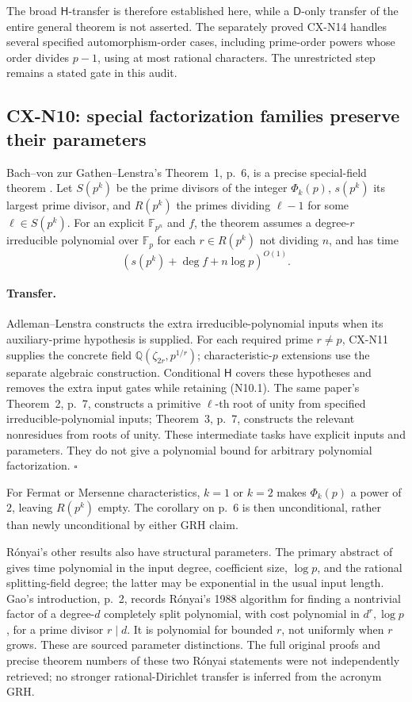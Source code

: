 \documentclass[11pt,a4paper]{article}
\begin{document}
The broad \(\mathsf H\)-transfer is therefore established here, while
a \(\mathsf D\)-only transfer of the entire general theorem is not
asserted. The separately proved CX-N14 handles several specified
automorphism-order cases, including prime-order powers whose order divides
\(p-1\), using at most rational characters. The unrestricted step
remains a stated gate in this audit.

\subsection{CX-N10: special factorization families preserve their parameters}
\label{cx-n10}

Bach--von zur Gathen--Lenstra's Theorem~1, p.~6, is a precise
special-field theorem \cite{CXNBGL01}. Let \(S(p^k)\) be the prime
divisors of the integer \(\Phi_k(p)\), \(s(p^k)\) its largest prime
divisor, and \(R(p^k)\) the primes dividing \(\ell-1\) for some
\(\ell\in S(p^k)\). For an explicit \(\mathbb F_{p^n}\) and \(f\),
the theorem assumes a degree-\(r\) irreducible polynomial over
\(\mathbb F_p\) for each \(r\in R(p^k)\) not dividing \(n\), and has time
\[
                     (s(p^k)+\deg f+n\log p)^{O(1)}.            \tag{N10.1}
\]

\paragraph{Transfer.}
Adleman--Lenstra constructs the extra irreducible-polynomial inputs
when its auxiliary-prime hypothesis is supplied.
For each required prime \(r\ne p\), CX-N11 supplies the concrete
field \(\mathbb Q(\zeta_{2r},p^{1/r})\); characteristic-\(p\)
extensions use the separate algebraic construction.
Conditional \(\mathsf H\) covers these hypotheses and removes the
extra input gates while retaining (N10.1).
The same paper's Theorem~2, p.~7, constructs a primitive
\(\ell\)-th root of unity from specified irreducible-polynomial inputs;
Theorem~3, p.~7, constructs the relevant nonresidues from roots of
unity. These intermediate tasks have explicit inputs and parameters.
They do not give a polynomial bound for arbitrary polynomial
factorization. \(\square\)

For Fermat or Mersenne characteristics, \(k=1\) or \(k=2\) makes
\(\Phi_k(p)\) a power of \(2\), leaving \(R(p^k)\) empty.
The corollary on p.~6 is then unconditional, rather than newly
unconditional by either GRH claim.

R\'onyai's other results also have structural parameters.
The primary abstract of \cite{CXNRonyai92} gives time polynomial in
the input degree, coefficient size, \(\log p\), and the rational
splitting-field degree; the latter may be exponential in the usual
input length. Gao's introduction, p.~2, records R\'onyai's 1988
algorithm for finding a nontrivial factor of a degree-\(d\) completely
split polynomial, with cost polynomial in \(d^r,\log p\), for a
prime divisor \(r\mid d\). It is polynomial for bounded \(r\), not
uniformly when \(r\) grows. These are sourced parameter distinctions.
The full original proofs and precise theorem numbers of these two
R\'onyai statements were not independently retrieved; no stronger
rational-Dirichlet transfer is inferred from the acronym GRH.
\end{document}
